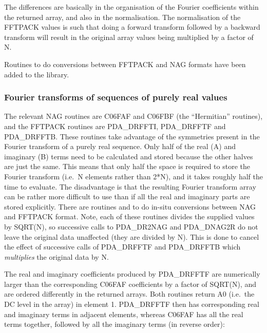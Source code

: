 \documentclass[11pt,twoside,nolof]{starlink}
\begin{document}
   The differences are basically in the organisation of the Fourier
   coefficients within the returned array, and also in the
   normalisation. The normalisation of the FFTPACK values is such that
   doing a forward transform followed by a backward transform will
   result in the original array values being multiplied by a factor of
   N.

   Routines to do conversions between FFTPACK and NAG formats have been
   added to the library.


\subsubsection{Fourier transforms of sequences of purely real values}

   The relevant NAG routines are C06FAF and C06FBF (the ``Hermitian''
   routines), and the FFTPACK routines are PDA\_DRFFTI, PDA\_DRFFTF and
   PDA\_DRFFTB.
   These routines take advantage of the symmetries present in the Fourier
   transform of a purely real sequence. Only half of the real (A) and
   imaginary (B) terms need to be calculated and stored because the
   other halves are just the same. This means that only half the space
   is required to store the Fourier transform (i.e.\ N elements rather
   than 2*N), and it takes roughly half the time to evaluate. The
   disadvantage is that the resulting Fourier transform array can be
   rather more difficult to use than if all the real and imaginary parts
   are stored explicitly. There are routines
 and
   to do in-situ conversions between NAG and FFTPACK format. Note, each
   of these routines divides the supplied values by SQRT(N), so
   successive calls to PDA\_DR2NAG and PDA\_DNAG2R do not leave the
   original data
   unaffected (they are divided by N). This is done to cancel the effect
   of successive calls of PDA\_DRFFTF and PDA\_DRFFTB which \emph{multiplies\/} the original data by N.

   The real and imaginary coefficients produced by PDA\_DRFFTF are
   numerically larger than the corresponding C06FAF coefficients by a
   factor of SQRT(N), and are ordered differently in the returned
   arrays. Both routines return A0 (i.e.\ the DC level in the array) in
   element 1. PDA\_DRFFTF then has corresponding real and imaginary terms in
   adjacent elements, whereas C06FAF has all the real terms together,
   followed by all the imaginary terms (in reverse order):
\end{document}

